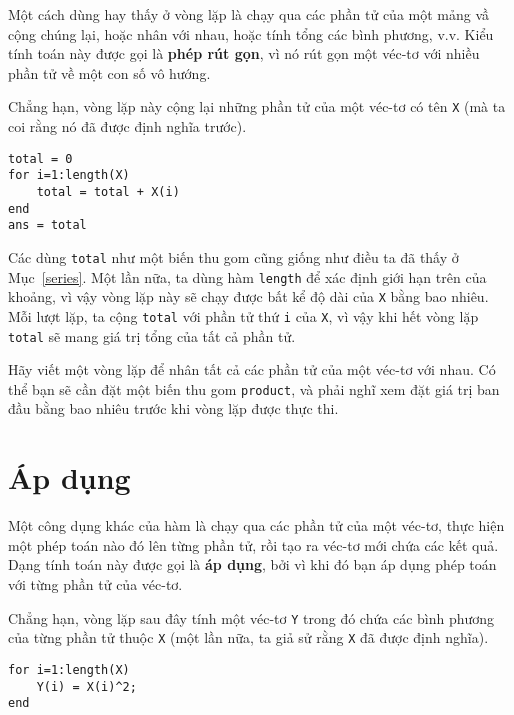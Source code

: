 \documentclass[12pt]{book}
\begin{document}
Một cách dùng hay thấy ở vòng lặp là chạy qua các phần tử của một
mảng vầ cộng chúng lại, hoặc nhân với nhau, hoặc tính tổng các
bình phương, v.v. Kiểu tính toán này được gọi là {\bf phép rút gọn},
vì nó rút gọn một véc-tơ với nhiều phần tử về một con số vô hướng.

Chẳng hạn, vòng lặp này cộng lại những phần tử của một véc-tơ có tên
{\tt X} (mà ta coi rằng nó đã được định nghĩa trước).

\begin{verbatim}
total = 0
for i=1:length(X)
    total = total + X(i)
end
ans = total
\end{verbatim}

Các dùng {\tt total} như một biến thu gom cũng giống như điều ta đã
thấy ở Mục~\ref{series}.  Một lần nữa, ta dùng hàm {\tt length}
để xác định giới hạn trên của khoảng, vì vậy vòng lặp này sẽ chạy
được bất kể độ dài của {\tt X} bằng bao nhiêu. Mỗi lượt lặp, 
ta cộng {\tt total} với phần tử thứ {\tt i} của {\tt X}, 
vì vậy khi hết vòng lặp {\tt total} sẽ mang giá trị tổng của
tất cả phần tử.

\begin{ex}
Hãy viết một vòng lặp để nhân tất cả các phần tử của một véc-tơ
với nhau. Có thể bạn sẽ cần đặt một biến thu gom {\tt product}, 
và phải nghĩ xem đặt giá trị ban đầu bằng bao nhiêu trước khi
vòng lặp được thực thi.
\end{ex}


\section{Áp dụng}
\label{apply}

Một công dụng khác của hàm là chạy qua các phần tử của một
véc-tơ, thực hiện một phép toán nào đó lên từng phần tử, rồi
tạo ra véc-tơ mới chứa các kết quả. Dạng tính toán này được
gọi là {\bf áp dụng}, bởi vì khi đó bạn áp dụng phép toán với
từng phần tử của véc-tơ.

Chẳng hạn, vòng lặp sau đây tính một véc-tơ {\tt Y} trong đó
chứa các bình phương của từng phần tử thuộc {\tt X} 
(một lần nữa, ta giả sử rằng {\tt X} đã được định nghĩa).

\begin{verbatim}
for i=1:length(X)
    Y(i) = X(i)^2;
end
\end{verbatim}
\end{document}
